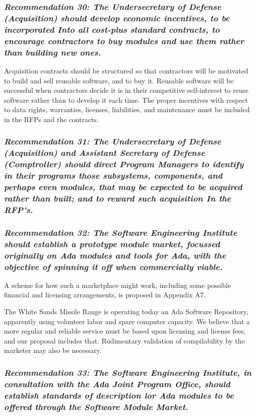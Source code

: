 \documentclass[12pt,final]{article}
\begin{document}
\subsubsection*{\textit{Recommendation 30: The Undersecretary of Defense
(Acquisition) should develop economic incentives, to be incorporated Into all
cost-plus standard contracts, to encourage contractors to buy modules and use
them rather than building new ones.}}

Acquisition contracts should be structured so that contractors will be
motivated to build and sell reusable software, and to buy it. Reusable software
will be successful when contractors decide it is in their competitive
self-interest to reuse software rather than to develop it each time. The proper
incentives with respect to data rights, warranties, licenses, liabilities, and
maintenance must be included in the RFPs and the contracts.

\subsubsection*{\textit{Recommendation 31: The Undersecretary of Defense
(Acquisition) and Assistant Secretary of Defense (Comptroller) should direct
Program Managers to identify in their programs those subsystems, components,
and perhaps even modules, that may be expected to be acquired rather than
built; and to reward such acquisition In the RFP’s.}}

\subsubsection*{\textit{Recommendation 32: The Software Engineering Institute
should establish a prototype module market, focussed originally on Ada modules
and tools for Ada, with the objective of spinning it off when commercially
viable.}}

A scheme for how such a marketplace might work, including some possible
financial and licensing arrangements, is proposed in Appendix A7.

The White Sands Missile Range is operating today an Ada Software Repository,
apparently using volunteer labor and spare computer capacity. We believe that a
more regular and reliable service must be based upon licensing and license
fees, and our proposal includes that. Rudimentary validation of compilability
by the marketer may also be necessary.

\subsubsection*{\textit{Recommendation 33: The Software Engineering Institute,
in consultation with the Ada Joint Program Office, should establish standards
of description lor Ada modules to be offered through the Software Module
Market.}}
\end{document}
